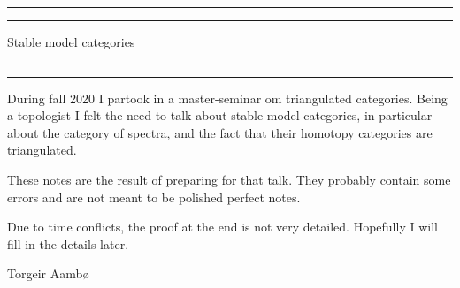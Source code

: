 


\begin{titlingpage}
    \vspace*{\fill}
    \rule[-11pt]{\textwidth}{1pt}
    \rule{\textwidth}{0.5pt}
    \begin{center}
    \Large Stable model categories
    \end{center}
    \rule{\textwidth}{0.5pt}
    \rule[10.1pt]{\textwidth}{1pt}
    \begin{center}
    During fall 2020 I partook in a master-seminar om triangulated categories. 
    Being a topologist I felt the need to talk about stable model categories, 
    in particular about the category of spectra, 
    and the fact that their homotopy categories are triangulated. 

    These notes are the result of preparing for that talk. 
    They probably contain some errors and are not meant to be polished perfect notes. 

    Due to time conflicts, the proof at the end is not very detailed. 
    Hopefully I will fill in the details later. 
    
    Torgeir Aambø 
    \end{center}
    \vspace{\fill}
    \tableofcontents
    \vspace{\fill}
\end{titlingpage}